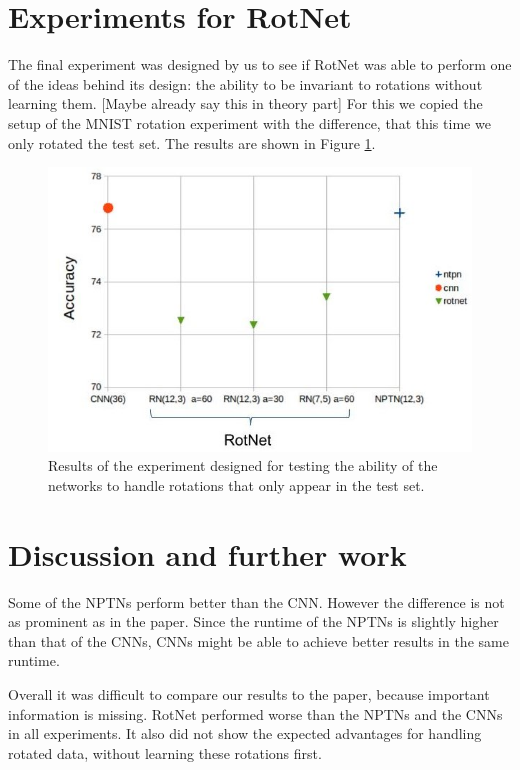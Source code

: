 \documentclass{llncs}
\begin{document}
\section{Experiments for RotNet}
The final experiment was designed by us to see if RotNet was able to perform one of the ideas behind its design: the ability to be invariant to rotations without learning them. [Maybe already say this in theory part] For this we copied the setup of the MNIST rotation experiment with the difference, that this time we only rotated the test set. The results are shown in Figure \ref{pic:experiment4}. 


\begin{figure}
	\begin{center}
	\includegraphics[scale=0.35]{result_images/experiment4.jpg}
	\caption{Results of the experiment designed for testing the ability of the networks to handle rotations that only appear in the test set.}
	\label{pic:experiment4}
	\end{center}
\end{figure}



\section{Discussion and further work}
Some of the NPTNs perform better than the CNN. However the difference is not as prominent as in the paper. Since the runtime of the NPTNs is slightly higher than that of the CNNs, CNNs might be able to achieve better results in the same runtime.

Overall it was difficult to compare our results to the paper, because important information is missing. 
RotNet performed worse than the NPTNs and the CNNs in all experiments.
It also did not show the expected advantages for handling rotated data, without learning these rotations first. 
\end{document}
